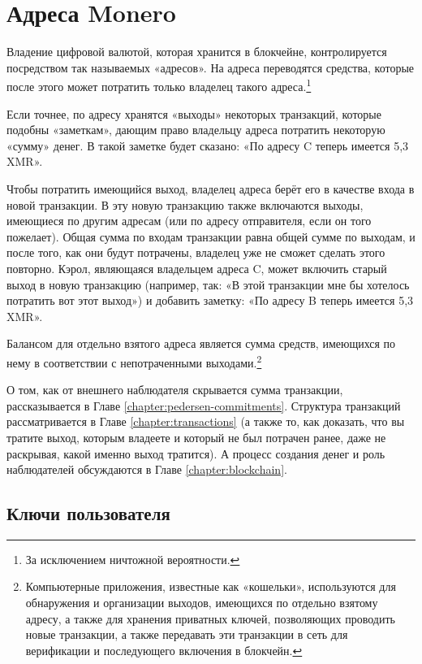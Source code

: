 \chapter{Адреса Monero}
\label{chapter:addresses}

Владение цифровой валютой, которая хранится в блокчейне, контролируется посредством так называемых «адресов». На адреса переводятся средства, которые после этого может потратить только владелец такого адреса.\footnote{За исключением ничтожной вероятности.}

Если точнее, по адресу хранятся «выходы» некоторых транзакций, которые подобны «замет\-кам», дающим право владельцу адреса потратить некоторую «сумму» денег. В такой заметке будет сказано: «По адресу C теперь имеется 5,3 XMR».

Чтобы потратить имеющийся выход, владелец адреса берёт его в качестве входа в новой транзакции. В эту новую транзакцию также включаются выходы, имеющиеся по другим адресам (или по адресу отправителя, если он того пожелает). Общая сумма по входам транзакции равна общей сумме по выходам, и после того, как они будут потрачены, владелец уже не сможет сделать этого повторно. Кэрол, являющаяся владельцем адреса C, может включить старый выход в новую транзакцию (например, так: «В этой транзакции мне бы хотелось потратить вот этот выход») и добавить заметку: «По адресу B теперь имеется 5,3 XMR».

Балансом для отдельно взятого адреса является сумма средств, имеющихся по нему в соответ\-ствии с непотраченными выходами.\footnote{Компьютерные приложения, известные как «кошельки», используются для обнаружения и организации выходов, имеющихся по отдельно взятому адресу, а также для хранения приватных ключей, позволяющих проводить новые транзакции, а также передавать эти транзакции в сеть для верификации и последующего включения в блокчейн.}

О том, как от внешнего наблюдателя скрывается сумма транзакции, рассказывается в Главе \ref{chapter:pedersen-commitments}. Структура транзакций рассматривается в Главе \ref{chapter:transactions} (а также то, как доказать, что вы тратите выход, которым владеете и который не был потрачен ранее, даже не раскрывая, какой именно выход тратится). А процесс создания денег и роль наблюдателей обсуждаются в Главе \ref{chapter:blockchain}.



\section{Ключи пользователя}
\label{sec:user-keys}

